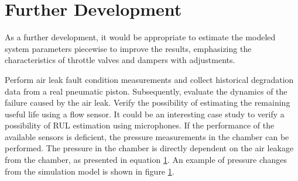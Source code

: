 \section{Further Development}
As a further development, it would be appropriate to estimate the modeled
system parameters piecewise to improve the results, emphasizing the
characteristics of throttle valves and dampers with adjustments. 

Perform air leak fault condition measurements and collect historical
degradation data from a real pneumatic piston. Subsequently, evaluate the
dynamics of the failure caused by the air leak. Verify the possibility of
estimating the remaining useful life using a flow sensor. It could be an
interesting case study to verify a possibility of RUL estimation using
microphones. If the performance of the available sensors is deficient, the
pressure measurements in the chamber can be performed. The pressure in the
chamber is directly dependent on the air leakage from the chamber, as
presented in equation \ref{}. An example of pressure changes from the
simulation model is shown in figure \ref{}.

